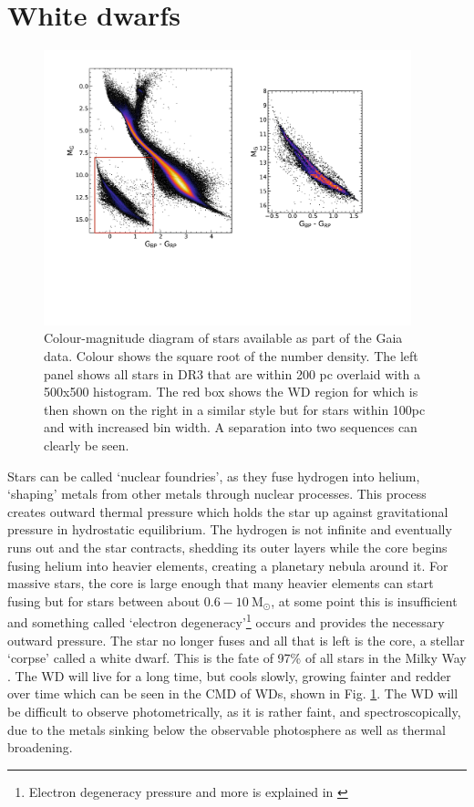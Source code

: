 \section{White dwarfs}\label{sec:p2-whitedwarfs}
\begin{figure}[t!]
    \centering
    \includegraphics[width=0.95\textwidth]{images/gaiacmr.pdf}
    \caption{Colour-magnitude diagram of stars available as part of the Gaia data. Colour shows the square root of the number density. The left panel shows all stars in DR3 that are within 200 pc overlaid with a 500x500 histogram. The red box shows the WD region for which is then shown on the right in a similar style but for stars within 100pc and with increased bin width. A separation into two sequences can clearly be seen.} %
    \label{fig:cmd}
\end{figure}
Stars can be called `nuclear foundries', as they fuse hydrogen into helium, `shaping' metals from other metals through nuclear processes. This process creates outward thermal pressure which holds the star up against gravitational pressure in hydrostatic equilibrium. The hydrogen is not infinite and eventually runs out and the star contracts, shedding its outer layers while the core begins fusing helium into heavier elements, creating a planetary nebula around it. For massive stars, the core is large enough that many heavier elements can start fusing but for stars between about $0.6-10\ \mathrm{M}_\odot$, at some point this is insufficient and something called `electron degeneracy'\footnote{Electron degeneracy pressure and more is explained in \cite{kippenhahn:12}} occurs and provides the necessary outward pressure. The star no longer fuses and all that is left is the core, a stellar `corpse' called a white dwarf. This is the fate of 97\% of all stars in the Milky Way \citep{fontaine:01}. The WD will live for a long time, but cools slowly, growing fainter and redder over time which can be seen in the CMD of WDs, shown in Fig. \ref{fig:cmd}. The WD will be difficult to observe photometrically, as it is rather faint, and spectroscopically, due to the metals sinking below the observable photosphere as well as thermal broadening. 

